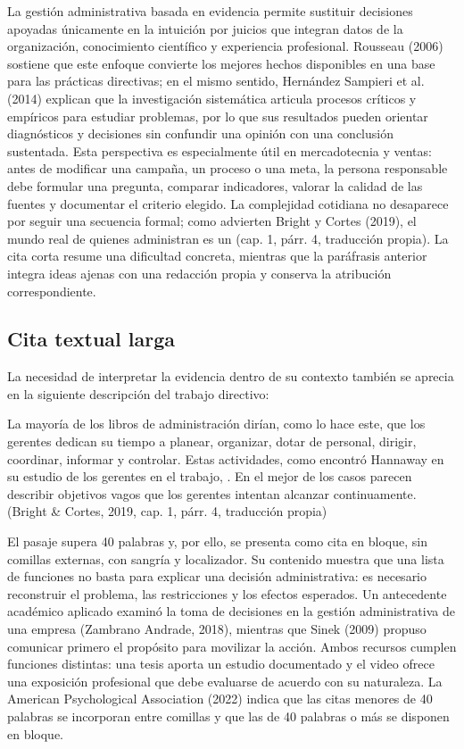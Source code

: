 \documentclass[spanish,letterpaper,oneside]{article}
\newenvironment{apablockquote}{%
  \begin{list}{}{\setlength{\leftmargin}{1.27cm}\setlength{\rightmargin}{0cm}}\item\relax
}{\end{list}}
\begin{document}
La gestión administrativa basada en evidencia permite sustituir decisiones apoyadas únicamente en la intuición por juicios que integran datos de la organización, conocimiento científico y experiencia profesional. Rousseau (2006) sostiene que este enfoque convierte los mejores hechos disponibles en una base para las prácticas directivas; en el mismo sentido, Hernández Sampieri et al. (2014) explican que la investigación sistemática articula procesos críticos y empíricos para estudiar problemas, por lo que sus resultados pueden orientar diagnósticos y decisiones sin confundir una opinión con una conclusión sustentada. Esta perspectiva es especialmente útil en mercadotecnia y ventas: antes de modificar una campaña, un proceso o una meta, la persona responsable debe formular una pregunta, comparar indicadores, valorar la calidad de las fuentes y documentar el criterio elegido. La complejidad cotidiana no desaparece por seguir una secuencia formal; como advierten Bright y Cortes (2019), el mundo real de quienes administran es un  (cap. 1, párr. 4, traducción propia). La cita corta resume una dificultad concreta, mientras que la paráfrasis anterior integra ideas ajenas con una redacción propia y conserva la atribución correspondiente.

\subsection{Cita textual larga}

La necesidad de interpretar la evidencia dentro de su contexto también se aprecia en la siguiente descripción del trabajo directivo:

\begin{apablockquote}
La mayoría de los libros de administración dirían, como lo hace este, que los gerentes dedican su tiempo a planear, organizar, dotar de personal, dirigir, coordinar, informar y controlar. Estas actividades, como encontró Hannaway en su estudio de los gerentes en el trabajo, . En el mejor de los casos parecen describir objetivos vagos que los gerentes intentan alcanzar continuamente. (Bright \& Cortes, 2019, cap. 1, párr. 4, traducción propia)
\end{apablockquote}

El pasaje supera 40 palabras y, por ello, se presenta como cita en bloque, sin comillas externas, con sangría y localizador. Su contenido muestra que una lista de funciones no basta para explicar una decisión administrativa: es necesario reconstruir el problema, las restricciones y los efectos esperados. Un antecedente académico aplicado examinó la toma de decisiones en la gestión administrativa de una empresa (Zambrano Andrade, 2018), mientras que Sinek (2009) propuso comunicar primero el propósito para movilizar la acción. Ambos recursos cumplen funciones distintas: una tesis aporta un estudio documentado y el video ofrece una exposición profesional que debe evaluarse de acuerdo con su naturaleza. La American Psychological Association (2022) indica que las citas menores de 40 palabras se incorporan entre comillas y que las de 40 palabras o más se disponen en bloque.
\end{document}
